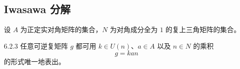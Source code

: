 \subsection{Iwasawa 分解}

设 $A$ 为正定实对角矩阵的集合，$N$ 为对角成分全为 $1$ 的复上三角矩阵的集合。

\begin{theorem*}{6.2.3}
任意可逆复矩阵 $g$ 都可用 $k\in U(n)$、$a\in A$ 以及 $n\in N$ 的乘积
\begin{equation}
  g=kan
  \tag{6.2.6}
\end{equation}
的形式唯一地表出。
\end{theorem*}

